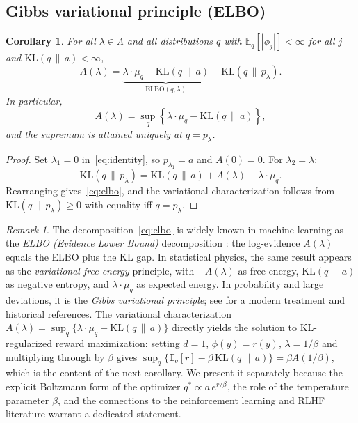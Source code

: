 \documentclass[11pt, a4paper, 
onecolumn, 
showabstract]{naverlabseurope-onecol-flex}
\newtheorem{corollary}[theorem]{Corollary}
\theoremstyle{definition}
\theoremstyle{remark}
\newtheorem{remark}[theorem]{Remark}
\newcommand{\KL}[2]{\mathrm{KL}\!\left(#1 \,\|\, #2\right)}
\newcommand{\E}{\mathbb{E}}
\begin{document}
\subsection{Gibbs variational principle (ELBO)}\label{sec:elbo}

\begin{corollary}\label{cor:gibbs}
For all $\lambda \in \Lambda$ and all distributions $q$ with $\E_q[|\phi_j|] < \infty$ for all $j$ and $\KL{q}{a} < \infty$,
\begin{equation}\label{eq:elbo}
    A(\lambda) = \underbrace{\lambda \cdot \mu_q - \KL{q}{a}}_{\mathrm{ELBO}(q,\lambda)} + \KL{q}{p_\lambda}.
\end{equation}
In particular,
\[
    A(\lambda) = \sup_q \left\{ \lambda \cdot \mu_q - \KL{q}{a} \right\},
\]
and the supremum is attained uniquely at $q = p_\lambda$.
\end{corollary}

\begin{proof}
Set $\lambda_1 = 0$ in~\eqref{eq:identity}, so $p_{\lambda_1} = a$ and $A(0) = 0$.
For $\lambda_2 = \lambda$:
\[
    \KL{q}{p_\lambda} = \KL{q}{a} + A(\lambda) - \lambda \cdot \mu_q.
\]
Rearranging gives~\eqref{eq:elbo}, and the variational characterization follows from $\KL{q}{p_\lambda} \geq 0$ with equality iff $q = p_\lambda$.
\end{proof}

\begin{remark}
The decomposition~\eqref{eq:elbo} is widely known in machine learning as the \emph{ELBO (Evidence Lower Bound)} decomposition \cite{Jordan1999,BleiKucukelbirMcAuliffe2017}: the log-evidence $A(\lambda)$ equals the ELBO plus the KL gap.
In statistical physics, the same result appears as the \emph{variational free energy} principle, with $-A(\lambda)$ as free energy, $\KL{q}{a}$ as negative entropy, and $\lambda \cdot \mu_q$ as expected energy.
In probability and large deviations, it is the \emph{Gibbs variational principle}; 
see \cite[Chapter~4]{PolyanskiyWu2025} for a modern treatment and historical references.
The variational characterization $A(\lambda) = \sup_q\{\lambda\cdot\mu_q - \KL{q}{a}\}$ directly yields the solution to KL-regularized reward maximization: setting $d=1$, $\phi(y)=r(y)$, $\lambda=1/\beta$ and multiplying through by $\beta$ gives $\sup_q\{\E_q[r]-\beta\,\KL{q}{a}\} = \beta A(1/\beta)$, which is the content of the next corollary. We present it separately because the explicit Boltzmann form of the optimizer $q^*\propto a\,e^{r/\beta}$, the role of the temperature parameter $\beta$, and the connections to the reinforcement learning and RLHF literature warrant a dedicated statement.
\end{remark}
\end{document}
